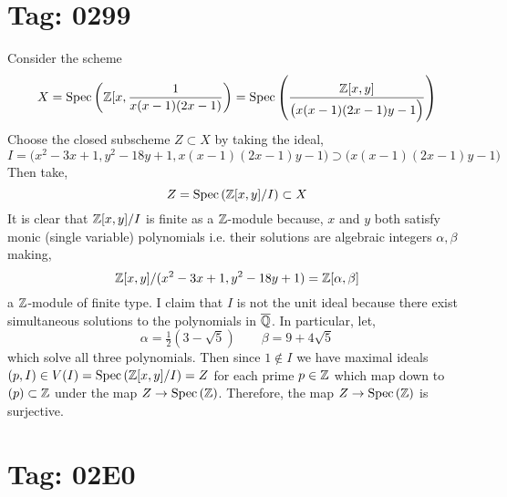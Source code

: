 \documentclass[12pt]{article}
\begin{document}
\section{Tag: 0299}

Consider the scheme 
\[ X = \mathrm{Spec}\left( \mathbb{Z}[x, \frac{1}{x(x-1)(2x - 1)} \right) = \mathrm{Spec}\left( \frac{\mathbb{Z}[x,y]}{\big( x(x - 1)(2x - 1)y - 1 \Big)} \right) \]
Choose the closed subscheme $Z \subset X$ by taking the ideal,
\[ I = \Big( x^2 - 3x + 1, y^2 - 18 y + 1,  x(x - 1)(2x - 1)y - 1 \Big) \supset \big( x(x - 1)(2x - 1)y - 1 \Big) \]
Then take,
\[ Z = \mathrm{Spec}\left( \mathbb{Z}[x,y]/I \right) \subset X \]
It is clear that $\mathbb{Z}[x,y]/I$ is finite as a $\mathbb{Z}$-module because, $x$ and $y$ both satisfy monic (single variable) polynomials i.e. their solutions are algebraic integers $\alpha, \beta$ making,
\[ \mathbb{Z}[x,y]/(x^2 - 3x + 1, y^2 - 18 y + 1) = \mathbb{Z}[\alpha, \beta] \]
a $\mathbb{Z}$-module of finite type. I claim that $I$ is not the unit ideal because there exist simultaneous solutions to the polynomials in $\overline{\mathbb{Q}}$. In particular, let,
\[ \alpha = \tfrac{1}{2} (3 - \sqrt{5}) \quad \quad \beta = 9 + 4 \sqrt{5} \]
which solve all three polynomials. Then since $1 \notin I$ we have maximal ideals $(p, I) \in V(I) = \mathrm{Spec}\left( \mathbb{Z}[x,y]/I \right) = Z$ for each prime $p \in \mathbb{Z}$ which map down to $(p) \subset \mathbb{Z}$ under the map $Z \to \mathrm{Spec}\left( \mathbb{Z} \right)$. Therefore, the map $Z \to \mathrm{Spec}\left( \mathbb{Z} \right)$ is surjective. 



\section{Tag: 02E0}
\end{document}
